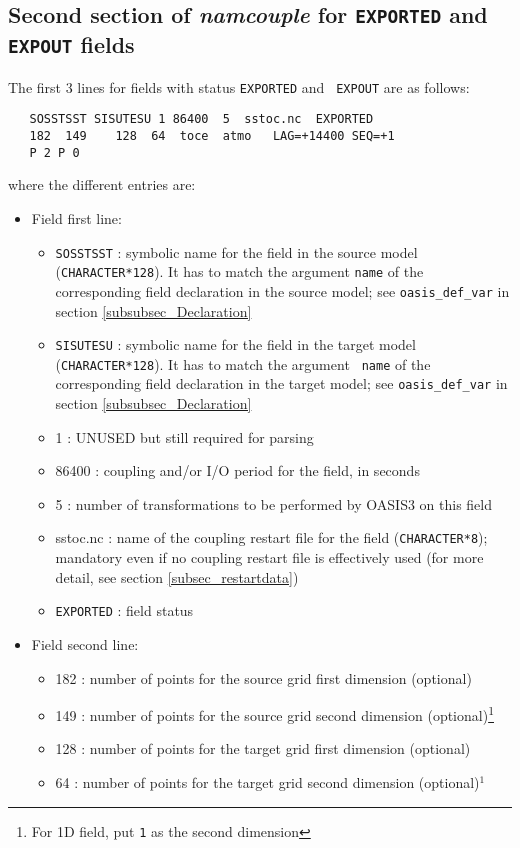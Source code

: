\subsection{Second section of {\it namcouple} for {\tt EXPORTED} and
  {\tt EXPOUT} fields}
\label{subsubsec_secondEXPORTED}

The first 3 lines for fields with status {\tt EXPORTED} and {\tt
  EXPOUT} are as follows:
  \begin{verbatim}
   SOSSTSST SISUTESU 1 86400  5  sstoc.nc  EXPORTED
   182  149    128  64  toce  atmo   LAG=+14400 SEQ=+1
   P 2 P 0 
\end{verbatim}
where the different entries are:
\begin{itemize}
\item Field first line:
  \begin{itemize}
  \item {\tt SOSSTSST} : symbolic name for the field in the source
    model ({\tt CHARACTER*128}). It has to match the argument {\tt name}
    of the corresponding field declaration in the source model; see
    {\tt oasis\_def\_var} in section \ref{subsubsec_Declaration}
  \item {\tt SISUTESU} : symbolic name for the field in the target
    model ({\tt CHARACTER*128}).  It has to match the argument {\tt
      name} of the corresponding field declaration in the target
    model; see {\tt oasis\_def\_var} in section
    \ref{subsubsec_Declaration}
  \item 1 : UNUSED but still required for parsing
  \item 86400 : coupling and/or I/O period for the field, in seconds
  \item 5 : number of transformations to be performed by OASIS3 on
    this field
  \item sstoc.nc : name of the coupling restart file for the field
    ({\tt CHARACTER*8}); mandatory even if no coupling restart file is
    effectively used (for more detail, see section
    \ref{subsec_restartdata})
  \item {\tt EXPORTED} : field status
  \end{itemize}
\item Field second line:
  \begin{itemize}
  \item 182 : number of points for the source grid first dimension
    (optional)
  \item 149 : number of points for the source grid second dimension
    (optional)\footnote{For 1D field, put {\tt 1} as the second dimension}
  \item 128 : number of points for the target grid first dimension
    (optional)
  \item 64 : number of points for the target grid second dimension
    (optional)$^{1}$


\end{itemize}
\end{itemize}
